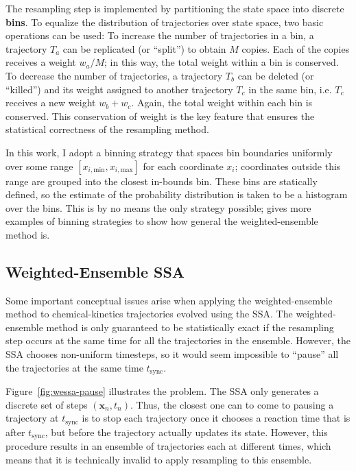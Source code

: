 \documentclass[english,letterpaper,12pt]{article}
\newcommand{\defkeywd}[1]{\textbf{#1}}
\renewcommand{\vec}[1]{\ensuremath{\mathbf{#1}}}
\begin{document}
\begin{doublespacing}
The resampling step is implemented by partitioning the state space into discrete \defkeywd{bins}. To equalize the distribution of trajectories over state space, two basic operations can be used: To increase the number of trajectories in a bin, a trajectory $T_a$ can be replicated (or ``split'') to obtain $M$ copies. Each of the copies receives a weight $w_a/M$; in this way, the total weight within a bin is conserved. To decrease the number of trajectories, a trajectory $T_b$ can be deleted (or ``killed'') and its weight assigned to another trajectory $T_c$ in the same bin, i.e. $T_c$ receives a new weight $w_b + w_c$. Again, the total weight within each bin is conserved. This conservation of weight is the key feature that ensures the statistical correctness of the resampling method.

In this work, I adopt a binning strategy that spaces bin boundaries uniformly over some range $[x_{i,\text{min}}, x_{i,\text{max}}]$ for each coordinate $x_i$; coordinates outside this range are grouped into the closest in-bounds bin. These bins are statically defined, so the estimate of the probability distribution is taken to be a histogram over the bins. This is by no means the only strategy possible; \cite{we-exact} gives more examples of binning strategies to show how general the weighted-ensemble method is.


\subsection{Weighted-Ensemble SSA} %
\label{sub:wessa}

Some important conceptual issues arise when applying the weighted-ensemble method to chemical-kinetics trajectories evolved using the SSA. The weighted-ensemble method is only guaranteed to be statistically exact if the resampling step occurs at the same time for all the trajectories in the ensemble. However, the SSA chooses non-uniform timesteps, so it would seem impossible to ``pause'' all the trajectories at the same time $t_\text{sync}$. 

Figure~\ref{fig:wessa-pause} illustrates the problem. The SSA only generates a discrete set of steps $(\vec{x}_n, t_n)$. Thus, the closest one can to come to pausing a trajectory at $t_\text{sync}$ is to stop each trajectory once it chooses a reaction time that is after $t_\text{sync}$, but before the trajectory actually updates its state. However, this procedure results in an ensemble of trajectories each at different times, which means that it is technically invalid to apply resampling to this ensemble.


\end{doublespacing}
\end{document}
